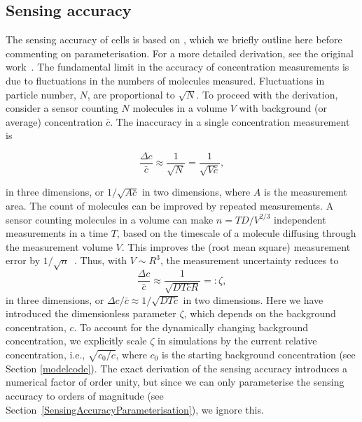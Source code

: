 \documentclass[review]{elsarticle}
\begin{document}
    	\subsection{Sensing accuracy\label{sensingAccuracy}}
        The sensing accuracy of cells is based on \cite{Berg1977}, which we briefly outline here before commenting on parameterisation. For a more detailed derivation, see the original work~\cite{Berg1977}. The fundamental limit in the accuracy of concentration measurements is due to fluctuations in the numbers of molecules measured. {Fluctuations in particle number, $N$, are proportional to $\sqrt{N}$}. 
      {To proceed with the derivation, consider} a sensor counting $N$ molecules in a volume $V$ with background (or average) concentration $\bar{c}$. The inaccuracy in a single concentration measurement is
      
      \begin{equation}
      \frac{\Delta c}{\bar{c}} \approx \frac{1}{\sqrt{N}} = \frac{1}{\sqrt{V\bar{c}}} ,
      \label{singlemeasurement}
      \end{equation}
      
    \noindent in three dimensions, or $1/\sqrt{A\bar{c}}$ in two dimensions, where $A$ is the measurement area. The count of molecules can be improved by repeated measurements. A sensor counting molecules in a volume can make $n = TD/V^{2/3}$ independent measurements in a time $T$, based on the timescale of a molecule diffusing through the measurement volume $V$. This improves the (root mean square) measurement error by $1/\sqrt{n}$~\cite{Berg1977}. Thus, with $V\sim R^3$, the measurement uncertainty reduces to
      \begin{equation}
      \frac{\Delta c}{\bar{c}} \approx \frac{1}{\sqrt{DT\bar{c}R}} =: \zeta,
      \label{sensingaccuracy}
      \end{equation}
      in three dimensions, or ${\Delta c}/{\bar{c}} \approx {1}/{\sqrt{DT\bar{c}}}$ in two dimensions. {Here we have introduced the dimensionless parameter $\zeta$, which depends on the background concentration, $c$. To account for the dynamically changing background concentration, we  explicitly scale $\zeta$ in simulations by the current relative concentration, i.e., $\sqrt{c_0/c}$, where $c_0$ is the starting background concentration (see Section \ref{modelcode}).} The exact derivation of the sensing accuracy introduces a numerical factor of order unity, but since we can only parameterise the sensing accuracy to orders of magnitude (see Section~\ref{SensingAccuracyParameterisation}), we ignore this.
         
\end{document}
